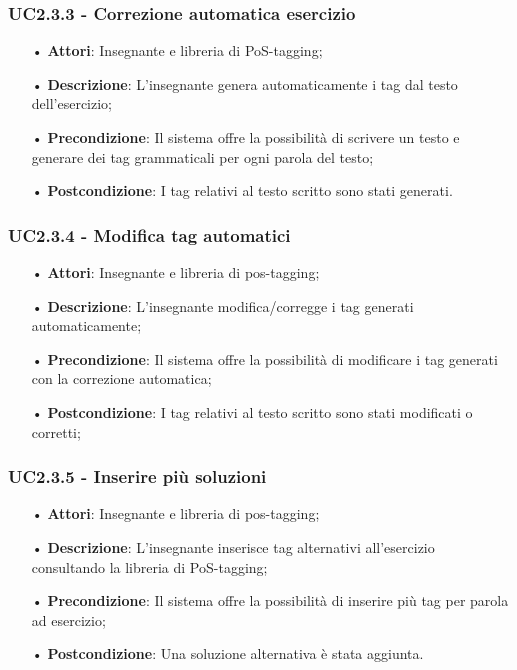 \subsubsection{UC2.3.3 - Correzione automatica esercizio}
\begin{itemize}
	\item[•] \textbf{Attori}: Insegnante e libreria di PoS-tagging;
	\item[•] \textbf{Descrizione}: L’insegnante genera automaticamente i tag dal testo dell’esercizio;
	\item[•] \textbf{Precondizione}: Il sistema offre la possibilità di scrivere un testo e generare dei tag grammaticali per ogni parola del testo;
	\item[•] \textbf{Postcondizione}: I tag relativi al testo scritto sono stati generati.
\end{itemize}

\subsubsection{UC2.3.4 - Modifica tag automatici}
\begin{itemize}
	\item[•] \textbf{Attori}: Insegnante e libreria di pos-tagging;
	\item[•] \textbf{Descrizione}: L’insegnante modifica/corregge i tag generati automaticamente;
	\item[•] \textbf{Precondizione}: Il sistema offre la possibilità di modificare i tag generati con la correzione automatica;
	\item[•] \textbf{Postcondizione}: I tag relativi al testo scritto sono stati modificati o corretti;
\end{itemize}

\subsubsection{UC2.3.5 - Inserire più soluzioni}
\begin{itemize}
	\item[•] \textbf{Attori}: Insegnante e libreria di pos-tagging;
	\item[•] \textbf{Descrizione}: L'insegnante inserisce tag alternativi all’esercizio consultando la libreria di PoS-tagging;
	\item[•] \textbf{Precondizione}: Il sistema offre la possibilità di inserire più tag per parola ad 
			esercizio;
	\item[•] \textbf{Postcondizione}: Una soluzione alternativa è stata aggiunta.
\end{itemize}

